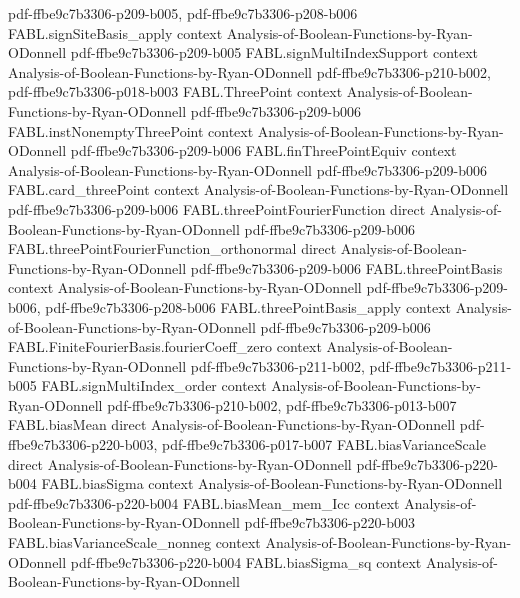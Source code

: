 \begin{theorem}
  {pdf-ffbe9c7b3306-p209-b005,
    pdf-ffbe9c7b3306-p208-b006}
\proofstep
  {FABL.signSiteBasis_apply}
  {context}
  {Analysis-of-Boolean-Functions-by-Ryan-ODonnell}
  {pdf-ffbe9c7b3306-p209-b005}
\proofstep
  {FABL.signMultiIndexSupport}
  {context}
  {Analysis-of-Boolean-Functions-by-Ryan-ODonnell}
  {pdf-ffbe9c7b3306-p210-b002,
    pdf-ffbe9c7b3306-p018-b003}
\proofstep
  {FABL.ThreePoint}
  {context}
  {Analysis-of-Boolean-Functions-by-Ryan-ODonnell}
  {pdf-ffbe9c7b3306-p209-b006}
\proofstep
  {FABL.instNonemptyThreePoint}
  {context}
  {Analysis-of-Boolean-Functions-by-Ryan-ODonnell}
  {pdf-ffbe9c7b3306-p209-b006}
\proofstep
  {FABL.finThreePointEquiv}
  {context}
  {Analysis-of-Boolean-Functions-by-Ryan-ODonnell}
  {pdf-ffbe9c7b3306-p209-b006}
\proofstep
  {FABL.card_threePoint}
  {context}
  {Analysis-of-Boolean-Functions-by-Ryan-ODonnell}
  {pdf-ffbe9c7b3306-p209-b006}
\proofstep
  {FABL.threePointFourierFunction}
  {direct}
  {Analysis-of-Boolean-Functions-by-Ryan-ODonnell}
  {pdf-ffbe9c7b3306-p209-b006}
\proofstep
  {FABL.threePointFourierFunction_orthonormal}
  {direct}
  {Analysis-of-Boolean-Functions-by-Ryan-ODonnell}
  {pdf-ffbe9c7b3306-p209-b006}
\proofstep
  {FABL.threePointBasis}
  {context}
  {Analysis-of-Boolean-Functions-by-Ryan-ODonnell}
  {pdf-ffbe9c7b3306-p209-b006,
    pdf-ffbe9c7b3306-p208-b006}
\proofstep
  {FABL.threePointBasis_apply}
  {context}
  {Analysis-of-Boolean-Functions-by-Ryan-ODonnell}
  {pdf-ffbe9c7b3306-p209-b006}
\proofstep
  {FABL.FiniteFourierBasis.fourierCoeff_zero}
  {context}
  {Analysis-of-Boolean-Functions-by-Ryan-ODonnell}
  {pdf-ffbe9c7b3306-p211-b002,
    pdf-ffbe9c7b3306-p211-b005}
\proofstep
  {FABL.signMultiIndex_order}
  {context}
  {Analysis-of-Boolean-Functions-by-Ryan-ODonnell}
  {pdf-ffbe9c7b3306-p210-b002,
    pdf-ffbe9c7b3306-p013-b007}
\proofstep
  {FABL.biasMean}
  {direct}
  {Analysis-of-Boolean-Functions-by-Ryan-ODonnell}
  {pdf-ffbe9c7b3306-p220-b003,
    pdf-ffbe9c7b3306-p017-b007}
\proofstep
  {FABL.biasVarianceScale}
  {direct}
  {Analysis-of-Boolean-Functions-by-Ryan-ODonnell}
  {pdf-ffbe9c7b3306-p220-b004}
\proofstep
  {FABL.biasSigma}
  {context}
  {Analysis-of-Boolean-Functions-by-Ryan-ODonnell}
  {pdf-ffbe9c7b3306-p220-b004}
\proofstep
  {FABL.biasMean_mem_Icc}
  {context}
  {Analysis-of-Boolean-Functions-by-Ryan-ODonnell}
  {pdf-ffbe9c7b3306-p220-b003}
\proofstep
  {FABL.biasVarianceScale_nonneg}
  {context}
  {Analysis-of-Boolean-Functions-by-Ryan-ODonnell}
  {pdf-ffbe9c7b3306-p220-b004}
\proofstep
  {FABL.biasSigma_sq}
  {context}
  {Analysis-of-Boolean-Functions-by-Ryan-ODonnell}

\end{theorem}
